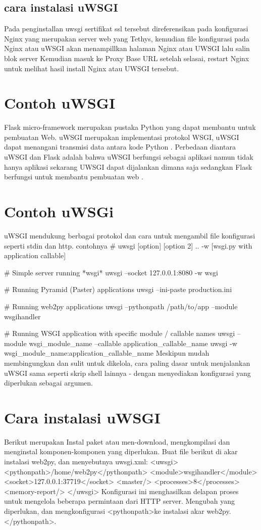 \subsection {cara instalasi uWSGI}
Pada penginstallan uwsgi sertifikat ssl tersebut direferensikan pada konfigurasi Nginx yang merupakan server web yang Tethys, kemudian file konfigurasi pada Nginx atau uWSGI akan menampillkan halaman Nginx atau UWSGI lalu salin blok server Kemudian masuk ke Proxy Base URL setelah selasai, restart Nginx untuk melihat hasil install Nginx atau UWSGI tersebut\cite{pellicer2016desarrollo}.

\section{Contoh uWSGI}
Flask micro-framework merupakan pustaka Python yang dapat membantu untuk pembuatan Web. uWSGI merupakan implementasi protokol WSGI, uWSGI dapat menangani transmisi data
antara kode Python . Perbedaan diantara uWSGI dan Flask adalah bahwa uWSGI berfungsi sebagai aplikasi namun tidak hanya aplikasi sekarang UWSGI dapat dijalankan dimana saja sedangkan Flask berfungsi untuk membantu pembuatan web \cite{mulerolinked}.

\section{Contoh uWSGi}
uWSGI mendukung berbagai protokol dan cara untuk mengambil file  konfigurasi seperti stdin dan http. contohnya
# uwsgi [option] [option 2] .. -w [wsgi.py with application callable]

# Simple server running *wsgi*
uwsgi --socket 127.0.0.1:8080 -w wsgi

# Running Pyramid (Paster) applications
uwsgi --ini-paste production.ini

# Running web2py applications
uwsgi --pythonpath /path/to/app --module wsgihandler

# Running WSGI application with specific module / callable names
uwsgi --module wsgi_module_name --callable application_callable_name
uwsgi -w wsgi_module_name:application_callable_name
Meskipun mudah membingungkan dan sulit untuk dikelola, cara paling dasar untuk menjalankan uWSGI sama seperti skrip shell lainnya - dengan menyediakan konfigurasi yang diperlukan sebagai argumen\cite{cencini2017data}.

\section{Cara instalasi uWSGI}
Berikut merupakan Instal paket atau men-download, mengkompilasi dan menginstal komponen-komponen yang diperlukan.
Buat file berikut di akar instalasi web2py, dan menyebutnya uwsgi.xml:
<uwsgi>
 <pythonpath>/home/web2py</pythonpath>
 <module>wsgihandler</module>
 <socket>127.0.0.1:37719</socket>
 <master/>
 <processes>8</processes>
 <memory-report/>
</uwsgi>
Konfigurasi ini menghasilkan delapan proses untuk mengelola beberapa permintaan dari
HTTP server. Mengubah yang diperlukan, dan mengkonfigurasi <pythonpath>ke instalasi
akar web2py.</pythonpath>\cite{reingart2012web2py}.

